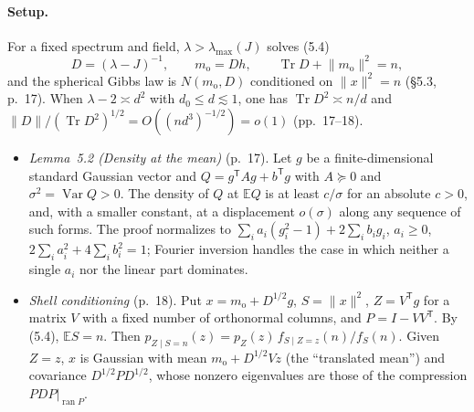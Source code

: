 \documentclass[11pt]{article}
\newcommand{\E}{\mathbb{E}}
\DeclareMathOperator{\Var}{Var}
\DeclareMathOperator{\Tr}{Tr}
\DeclareMathOperator{\ran}{ran}
\newcommand{\norm}[1]{\lVert #1\rVert}
\newcommand{\ploc}[2]{#1}
\begin{document}
\paragraph{Setup.}
For a fixed spectrum and field, $\lambda>\lambda_{\max}(J)$ solves
\ploc{(5.4)}{profile-spectral.tex:369--373}
\[
 D=(\lambda-J)^{-1},\qquad m_{\mathrm o}=Dh,\qquad
 \Tr D+\norm{m_{\mathrm o}}^2=n,
\]
and the spherical Gibbs law is $N(m_{\mathrm o},D)$ conditioned on
$\norm x^2=n$ \ploc{(\S5.3, p.~17)}{profile-spectral.tex:375--378}. When
$\lambda-2\asymp d^2$ with $d_0\le d\lesssim1$, one has $\Tr D^2\asymp n/d$
and $\norm D/(\Tr D^2)^{1/2}=O((nd^3)^{-1/2})=o(1)$
\ploc{(pp.~17--18)}{profile-spectral.tex:430--435, 471--474}.
\begin{itemize}
\item \emph{Lemma~5.2 (Density at the mean)}
 \ploc{(p.~17)}{profile-spectral.tex:392--398}. Let $g$ be a
 finite-dimensional standard Gaussian vector and
 $Q=g^{\mathsf T}Ag+b^{\mathsf T}g$ with $A\succeq0$ and $\sigma^2=\Var Q>0$.
 The density of $Q$ at $\E Q$ is at least $c/\sigma$ for an absolute $c>0$,
 and, with a smaller constant, at a displacement $o(\sigma)$ along any
 sequence of such forms. The proof normalizes to
 $\sum_ia_i(g_i^2-1)+2\sum_ib_ig_i$, $a_i\ge0$,
 $2\sum_ia_i^2+4\sum_ib_i^2=1$; Fourier inversion handles the case in which
 neither a single $a_i$ nor the linear part dominates.
\item \emph{Shell conditioning} \ploc{(p.~18)}{profile-spectral.tex:441--458}.
 Put $x=m_{\mathrm o}+D^{1/2}g$, $S=\norm x^2$, $Z=V^{\mathsf T}g$ for a
 matrix $V$ with a fixed number of orthonormal columns, and
 $P=I-VV^{\mathsf T}$. By (5.4), $\E S=n$. Then
 $p_{Z\mid S=n}(z)=p_Z(z)\,f_{S\mid Z=z}(n)/f_S(n)$. Given $Z=z$, $x$ is
 Gaussian with mean $m_{\mathrm o}+D^{1/2}Vz$ (the ``translated mean'') and
 covariance $D^{1/2}PD^{1/2}$, whose nonzero eigenvalues are those of the
 compression $PDP|_{\ran P}$.
\end{itemize}
\end{document}
